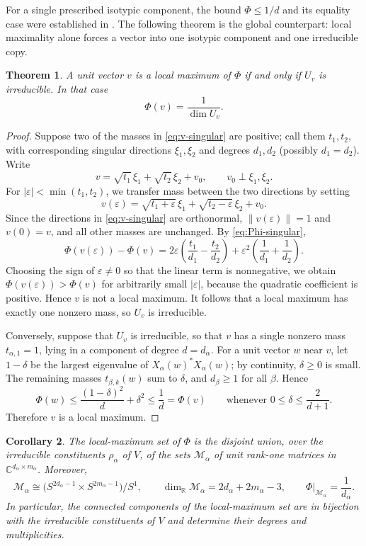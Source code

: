 \documentclass{amsart}
\newtheorem{theorem}{Theorem}
\newtheorem{corollary}[theorem]{Corollary}
\theoremstyle{remark}
\newcommand{\C}{\mathbb C}
\newcommand{\norm}[1]{\lVert #1\rVert}
\begin{document}
For a single prescribed isotypic component, the bound $\Phi\le 1/d$ and its equality case were
established in \cite{HsiehKang2026}. The following theorem is the global counterpart: local
maximality alone forces a vector into one isotypic component and one irreducible copy.
 
\begin{theorem}\label{thm:localmax}
A unit vector $v$ is a local maximum of $\Phi$ if and only if $U_v$ is irreducible. In that case
\[
 \Phi(v)=\frac1{\dim U_v}.
\]
\end{theorem}
 
\begin{proof}
Suppose two of the masses in \eqref{eq:v-singular} are positive; call them $t_1,t_2$, with
corresponding singular directions $\xi_1,\xi_2$ and degrees $d_1,d_2$ (possibly $d_1=d_2$). Write
\[
 v=\sqrt{t_1}\,\xi_1+\sqrt{t_2}\,\xi_2+v_0,
 \qquad
 v_0\perp \xi_1,\xi_2.
\]
For $|\varepsilon|<\min(t_1,t_2)$, we transfer mass between the two directions by setting
\[
 v(\varepsilon)=\sqrt{t_1+\varepsilon}\,\xi_1+\sqrt{t_2-\varepsilon}\,\xi_2+v_0.
\]
Since the directions in \eqref{eq:v-singular} are orthonormal, $\norm{v(\varepsilon)}=1$ and $v(0)=v$, and
all other masses are unchanged. By \eqref{eq:Phi-singular},
\[
 \Phi(v(\varepsilon))-\Phi(v)
 =2\varepsilon\left(\frac{t_1}{d_1}-\frac{t_2}{d_2}\right)
 +\varepsilon^2\left(\frac1{d_1}+\frac1{d_2}\right).
\]
Choosing the sign of $\varepsilon\ne0$ so that the linear term is nonnegative, we obtain
$\Phi(v(\varepsilon))>\Phi(v)$ for arbitrarily small $|\varepsilon|$, because the quadratic coefficient is positive.
Hence $v$ is not a local maximum. It follows that a local maximum has exactly one nonzero mass, so
$U_v$ is irreducible.
 
Conversely, suppose that $U_v$ is irreducible, so that $v$ has a single nonzero mass
$t_{\alpha,1}=1$, lying in a component of degree $d=d_\alpha$. For a unit vector $w$ near $v$, let
$1-\delta$ be the largest eigenvalue of $X_\alpha(w)^*X_\alpha(w)$; by continuity, $\delta\ge0$ is
small. The remaining masses $t_{\beta,k}(w)$ sum to $\delta$, and $d_\beta\ge1$ for all $\beta$.
Hence
\[
 \Phi(w)\le \frac{(1-\delta)^2}{d}+\delta^2\le \frac1d=\Phi(v)
 \qquad\text{whenever }0\le\delta\le \frac2{d+1}.
\]
Therefore $v$ is a local maximum.
\end{proof}
 
\begin{corollary}\label{cor:components}
The local-maximum set of $\Phi$ is the disjoint union, over the irreducible constituents $\rho_\alpha$
of $V$, of the sets $\mathcal M_\alpha$ of unit rank-one matrices in
$\C^{d_\alpha\times m_\alpha}$. Moreover,
\[
 \mathcal M_\alpha\cong
 \bigl(S^{2d_\alpha-1}\times S^{2m_\alpha-1}\bigr)/S^1,
 \qquad
 \dim_{\mathbb R}\mathcal M_\alpha=2d_\alpha+2m_\alpha-3,
 \qquad
 \Phi|_{\mathcal M_\alpha}=\frac1{d_\alpha}.
\]
In particular, the connected components of the local-maximum set are in bijection with the irreducible
constituents of $V$ and determine their degrees and multiplicities.
\end{corollary}
 
\end{document}
